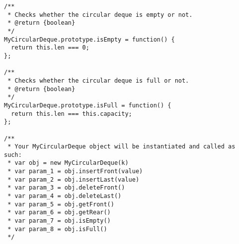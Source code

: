 \begin{verbatim}
/**
 * Checks whether the circular deque is empty or not.
 * @return {boolean}
 */
MyCircularDeque.prototype.isEmpty = function() {
  return this.len === 0;
};

/**
 * Checks whether the circular deque is full or not.
 * @return {boolean}
 */
MyCircularDeque.prototype.isFull = function() {
  return this.len === this.capacity;
};

/**
 * Your MyCircularDeque object will be instantiated and called as such:
 * var obj = new MyCircularDeque(k)
 * var param_1 = obj.insertFront(value)
 * var param_2 = obj.insertLast(value)
 * var param_3 = obj.deleteFront()
 * var param_4 = obj.deleteLast()
 * var param_5 = obj.getFront()
 * var param_6 = obj.getRear()
 * var param_7 = obj.isEmpty()
 * var param_8 = obj.isFull()
 */
\end{verbatim}
